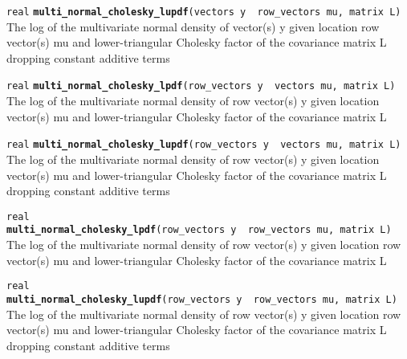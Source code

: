 \documentclass[
  10pt,
]{book}
\begin{document}
\texttt{real} \textbf{\texttt{multi\_normal\_cholesky\_lupdf}}\texttt{(vectors\ y\ \textbar{}\ row\_vectors\ mu,\ matrix\ L)}\newline
The log of the multivariate normal density of vector(s) y given
location row vector(s) mu and lower-triangular Cholesky factor of the
covariance matrix L dropping constant additive terms


\texttt{real} \textbf{\texttt{multi\_normal\_cholesky\_lpdf}}\texttt{(row\_vectors\ y\ \textbar{}\ vectors\ mu,\ matrix\ L)}\newline
The log of the multivariate normal density of row vector(s) y given
location vector(s) mu and lower-triangular Cholesky factor of the
covariance matrix L


\texttt{real} \textbf{\texttt{multi\_normal\_cholesky\_lupdf}}\texttt{(row\_vectors\ y\ \textbar{}\ vectors\ mu,\ matrix\ L)}\newline
The log of the multivariate normal density of row vector(s) y given
location vector(s) mu and lower-triangular Cholesky factor of the
covariance matrix L dropping constant additive terms


\texttt{real} \textbf{\texttt{multi\_normal\_cholesky\_lpdf}}\texttt{(row\_vectors\ y\ \textbar{}\ row\_vectors\ mu,\ matrix\ L)}\newline
The log of the multivariate normal density of row vector(s) y given
location row vector(s) mu and lower-triangular Cholesky factor of the
covariance matrix L


\texttt{real} \textbf{\texttt{multi\_normal\_cholesky\_lupdf}}\texttt{(row\_vectors\ y\ \textbar{}\ row\_vectors\ mu,\ matrix\ L)}\newline
The log of the multivariate normal density of row vector(s) y given
location row vector(s) mu and lower-triangular Cholesky factor of the
covariance matrix L dropping constant additive terms
\end{document}
